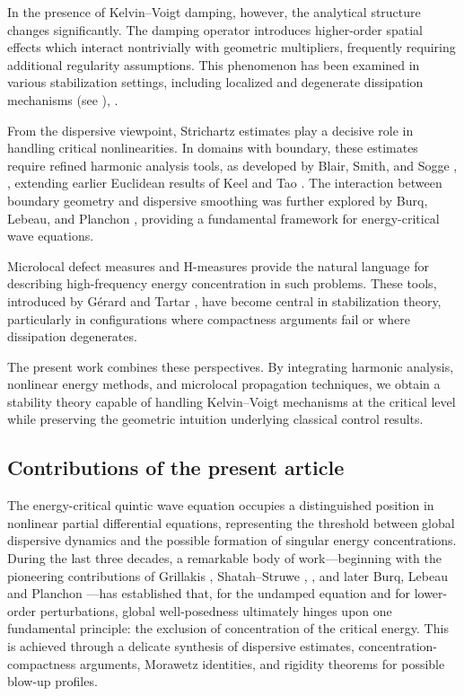 \documentclass[11pt,letterpaper]{amsart}
\begin{document}
In the presence of Kelvin--Voigt damping, however, the analytical structure
changes significantly. The damping operator introduces higher-order spatial
effects which interact nontrivially with geometric multipliers, frequently
requiring additional regularity assumptions. This phenomenon has been examined
in various stabilization settings, including localized and degenerate
dissipation mechanisms (see \cite{Ammari}), \cite{Liu-Rao}.

From the dispersive viewpoint, Strichartz estimates play a decisive role in
handling critical nonlinearities. In domains with boundary, these estimates
require refined harmonic analysis tools, as developed by Blair, Smith, and
Sogge \cite{BlairSmithSogge2009}, \cite{SmithSogge1995}, extending earlier Euclidean results of
Keel and Tao \cite{KeelTao}. The interaction between boundary geometry and
dispersive smoothing was further explored by Burq, Lebeau, and Planchon
\cite{BurqLebeauPlanchon}, providing a fundamental framework for energy-critical
wave equations.

Microlocal defect measures and H-measures provide the natural language for
describing high-frequency energy concentration in such problems. These tools,
introduced by G\'erard \cite{Gerard} and Tartar \cite{Tartar}, have become
central in stabilization theory, particularly in configurations where compactness
arguments fail or where dissipation degenerates.

The present work combines these perspectives. By integrating harmonic analysis,
nonlinear energy methods, and microlocal propagation techniques, we obtain a
stability theory capable of handling Kelvin--Voigt mechanisms at the critical
level while preserving the geometric intuition underlying classical control
results.

\subsection{Contributions of the present article}

The energy-critical quintic wave equation occupies a distinguished position in nonlinear partial differential equations, representing the threshold between global dispersive dynamics and the possible formation of singular energy concentrations. During the last three decades, a remarkable body of work---beginning with the pioneering contributions of Grillakis \cite{Grillakis}, Shatah--Struwe \cite{ShatahStruwe}, \cite{Struwe}, and later Burq, Lebeau and Planchon \cite{BurqLebeauPlanchon}---has established that, for the undamped equation and for lower-order perturbations, global well-posedness ultimately hinges upon one fundamental principle: the exclusion of concentration of the critical energy. This is achieved through a delicate synthesis of dispersive estimates, concentration-compactness arguments, Morawetz identities, and rigidity theorems for possible blow-up profiles.
\end{document}
